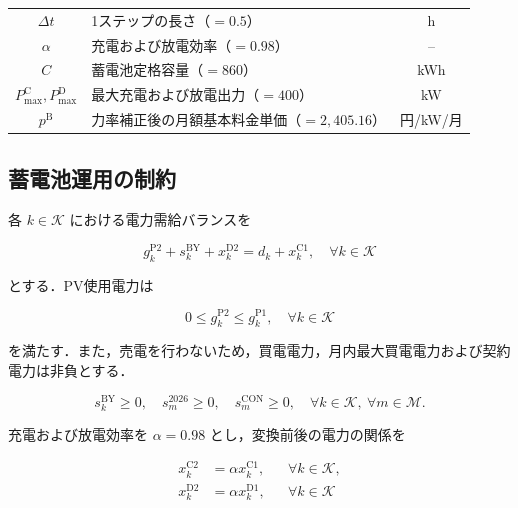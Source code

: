 \documentclass[a4paper,11pt,dvipdfmx]{jsarticle}
\begin{document}
\begin{table}[H]
\begin{tabular}{c p{92mm} c}
        $\Delta t$                                    & 1ステップの長さ（$=0.5$）              & h      \\
        $\alpha$                                      & 充電および放電効率（$=0.98$）            & --     \\
        $C$                                           & 蓄電池定格容量（$=860$）               & kWh    \\
        $P_{\max}^{\mathrm{C}},P_{\max}^{\mathrm{D}}$ & 最大充電および放電出力（$=400$）           & kW     \\
        $p^{\mathrm{B}}$                              & 力率補正後の月額基本料金単価（$=2{,}405.16$） & 円/kW/月 \\
        \bottomrule
    \end{tabular}

\end{table}

\subsection{蓄電池運用の制約}

各 $k\in\mathcal{K}$ における電力需給バランスを

\begin{equation}
    g_k^{\mathrm{P2}}+s_k^{\mathrm{BY}}+x_k^{\mathrm{D2}}
    =d_k+x_k^{\mathrm{C1}},
    \quad \forall k\in\mathcal{K}
\end{equation}

とする．PV使用電力は

\begin{equation}
    0\leq g_k^{\mathrm{P2}}\leq g_k^{\mathrm{P1}},
    \quad \forall k\in\mathcal{K}
\end{equation}

を満たす．また，売電を行わないため，買電電力，月内最大買電電力および契約電力は非負とする．

\begin{equation}
    s_k^{\mathrm{BY}}\geq0,\quad
    s_m^{2026}\geq0,\quad s_m^{\mathrm{CON}}\geq0,
    \quad \forall k\in\mathcal{K},\ \forall m\in\mathcal{M}.
\end{equation}

充電および放電効率を $\alpha=0.98$ とし，変換前後の電力の関係を

\begin{align}
    x_k^{\mathrm{C2}} & =\alpha x_k^{\mathrm{C1}},
                      &                            & \forall k\in\mathcal{K}, \\
    x_k^{\mathrm{D2}} & =\alpha x_k^{\mathrm{D1}},
                      &                            & \forall k\in\mathcal{K}
\end{align}
\end{document}
